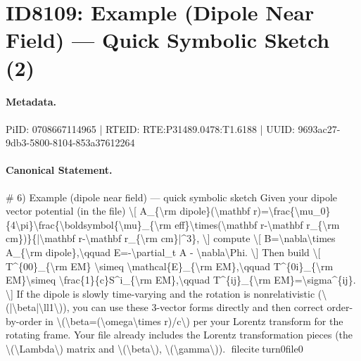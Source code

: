\section*{ID8109: Example (Dipole Near Field) — Quick Symbolic Sketch (2)}
\paragraph{Metadata.}
PiID: 0708667114965 | RTEID: RTE:P31489.0478:T1.6188 | UUID: 9693ac27-9db3-5800-8104-853a37612264

\paragraph{Canonical Statement.}
\# 6) Example (dipole near field) — quick symbolic sketch Given your dipole vector potential (in the file) \textbackslash{}[ A\_\{\textbackslash{}rm dipole\}(\textbackslash{}mathbf r)=\textbackslash{}frac\{\textbackslash{}mu\_0\}\{4\textbackslash{}pi\}\textbackslash{}frac\{\textbackslash{}boldsymbol\{\textbackslash{}mu\}\_\{\textbackslash{}rm eff\}\textbackslash{}times(\textbackslash{}mathbf r-\textbackslash{}mathbf r\_\{\textbackslash{}rm cm\})\}\{|\textbackslash{}mathbf r-\textbackslash{}mathbf r\_\{\textbackslash{}rm cm\}|\textasciicircum{}3\}, \textbackslash{}] compute \textbackslash{}[ B=\textbackslash{}nabla\textbackslash{}times A\_\{\textbackslash{}rm dipole\},\textbackslash{}qquad E=-\textbackslash{}partial\_t A - \textbackslash{}nabla\textbackslash{}Phi. \textbackslash{}] Then build \textbackslash{}[ T\textasciicircum{}\{00\}\_\{\textbackslash{}rm EM\} \textbackslash{}simeq \textbackslash{}mathcal\{E\}\_\{\textbackslash{}rm EM\},\textbackslash{}qquad T\textasciicircum{}\{0i\}\_\{\textbackslash{}rm EM\}\textbackslash{}simeq \textbackslash{}frac\{1\}\{c\}S\textasciicircum{}i\_\{\textbackslash{}rm EM\},\textbackslash{}qquad T\textasciicircum{}\{ij\}\_\{\textbackslash{}rm EM\}=\textbackslash{}sigma\textasciicircum{}\{ij\}. \textbackslash{}] If the dipole is slowly time-varying and the rotation is nonrelativistic (\textbackslash{}(|\textbackslash{}beta|\textbackslash{}ll1\textbackslash{})), you can use these 3-vector forms directly and then correct order-by-order in \textbackslash{}(\textbackslash{}beta=(\textbackslash{}omega\textbackslash{}times r)/c\textbackslash{}) per your Lorentz transform for the rotating frame. Your file already includes the Lorentz transformation pieces (the \textbackslash{}(\textbackslash{}Lambda\textbackslash{}) matrix and \textbackslash{}(\textbackslash{}beta\textbackslash{}), \textbackslash{}(\textbackslash{}gamma\textbackslash{})). fileciteturn0file0

